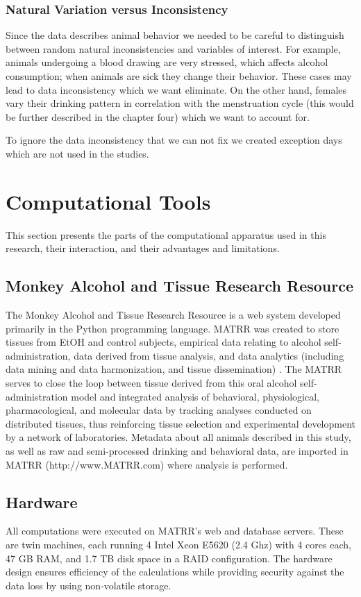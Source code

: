 		\subsubsection{Natural Variation versus Inconsistency}
		Since the data describes animal behavior we needed to be careful to distinguish between random natural inconsistencies and variables of interest. For example, animals undergoing a blood drawing are very stressed, which affects alcohol consumption; when animals are sick they change their behavior. These cases may lead to data inconsistency which we want eliminate. On the other hand, females vary their drinking pattern in correlation with the menstruation cycle (this would be further described in the chapter four) which we want to account for.
		
		To ignore the data inconsistency that we can not fix we created exception days which are not used in the studies.
	  
\section{Computational Tools}
	This section presents the parts of the computational apparatus used in this research, their interaction, and their advantages and limitations.
	\subsection{Monkey Alcohol and Tissue Research Resource}
	The Monkey Alcohol and Tissue Research Resource 
	is a web system developed primarily in the Python programming language. MATRR was created to store tissues from EtOH and control subjects, empirical data relating to alcohol self-administration, data
	derived from tissue analysis, and data analytics (including data
	mining and data harmonization, and tissue dissemination) . 
	The MATRR serves to close the loop between
	tissue derived from this oral alcohol self-administration model
	and integrated analysis of behavioral, physiological, pharmacological,
	and molecular data by tracking analyses conducted on
	distributed tissues, thus reinforcing tissue selection and experimental
	development by a network of laboratories. Metadata about all animals described in this study, as well as raw and
	semi-processed drinking and behavioral data, are imported in
	MATRR (http://www.MATRR.com) where analysis is performed.
	
	\subsection{Hardware}
	All computations were executed on MATRR’s web and database
	servers. These are twin machines, each running 4 Intel Xeon E5620
	(2.4 Ghz) with 4 cores each, 47 GB RAM, and 1.7 TB disk space in
	a RAID configuration. The hardware design ensures efficiency of the calculations while providing security against the data loss by using non-volatile storage. 
	
